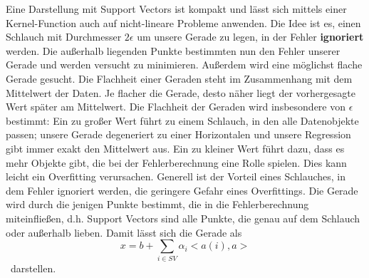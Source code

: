 Eine Darstellung mit Support Vectors ist kompakt und lässt sich mittels
einer Kernel-Function auch auf nicht-lineare Probleme anwenden.
Die Idee ist es, einen Schlauch mit Durchmesser \(2\epsilon\) um
unsere Gerade zu legen, in der Fehler \textbf{ignoriert} werden.
Die außerhalb liegenden Punkte bestimmten nun den Fehler unserer Gerade
und werden versucht zu minimieren. Außerdem wird eine möglichst flache 
Gerade gesucht. Die Flachheit einer Geraden steht im Zusammenhang mit
dem Mittelwert der Daten. Je flacher die Gerade, desto näher liegt der
vorhergesagte Wert später am Mittelwert. Die Flachheit der Geraden 
wird insbesondere von \(\epsilon\) bestimmt: Ein zu großer Wert
führt zu einem Schlauch, in den alle Datenobjekte passen; unsere Gerade
degeneriert zu einer Horizontalen und unsere Regression gibt immer
exakt den Mittelwert aus. Ein zu kleiner Wert führt dazu, dass es mehr
Objekte gibt, die bei der Fehlerberechnung eine Rolle spielen. Dies kann
leicht ein Overfitting verursachen. Generell ist der Vorteil eines
Schlauches, in dem Fehler ignoriert werden, die geringere Gefahr eines
Overfittings. Die Gerade wird durch die jenigen Punkte bestimmt, die
in die Fehlerberechnung miteinfließen, d.h. Support Vectors sind alle
Punkte, die genau auf dem Schlauch oder außerhalb lieben.
Damit lässt sich die Gerade als
\[x = b + \sum _{i \in SV} \alpha_i <a(i),a>\]\
darstellen.